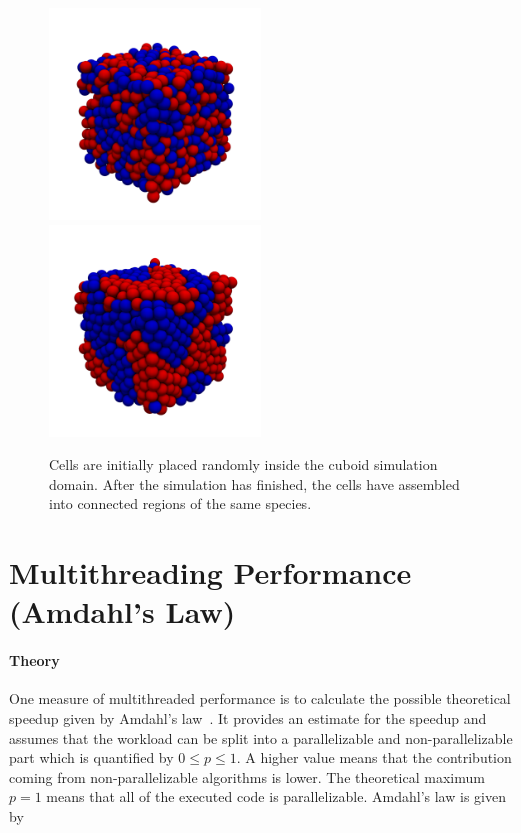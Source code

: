 \documentclass[fontsize=11pt,a4paper]{article}
\begin{document}
\begin{figure}
    \includegraphics[width=0.5\textwidth]{figures/cell_sorting/0000000020.png}%
    \includegraphics[width=0.5\textwidth]{figures/cell_sorting/0000010000.png}
    \caption{
        Cells are initially placed randomly inside the cuboid simulation domain.
        After the simulation has finished, the cells have assembled into connected regions of the
        same species.
    }
    \label{fig:cell-sorting-results}
\end{figure}

\section{Multithreading Performance (Amdahl's Law)}

\paragraph{Theory}
One measure of multithreaded performance is to calculate the possible theoretical speedup
given by Amdahl's law~\cite{Rodgers1985}.
It provides an estimate for the speedup and assumes that the workload can be split into a
parallelizable and non-parallelizable part which is quantified by $0\leq p \leq1$.
A higher value means that the contribution coming from non-parallelizable algorithms is lower.
The theoretical maximum $p=1$ means that all of the executed code is parallelizable.
Amdahl's law is given by
\end{document}
